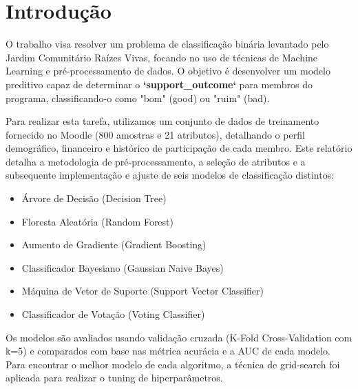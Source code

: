 \section*{Introdução}
O trabalho visa resolver um problema de classificação binária levantado pelo Jardim Comunitário Raízes Vivas, focando no uso de técnicas de Machine Learning e pré-processamento de dados.
O objetivo é desenvolver um modelo preditivo capaz de determinar o \textbf{`support\_outcome`} para membros do programa, classificando-o como "bom" (good) ou "ruim" (bad).

Para realizar esta tarefa, utilizamos um conjunto de dados de treinamento fornecido no Moodle (800 amostras e 21 atributos), detalhando o perfil demográfico, financeiro e histórico de participação de cada membro.
Este relatório detalha a metodologia de pré-processamento, a seleção de atributos e a subsequente implementação e ajuste de seis modelos de classificação distintos:
\begin{itemize}
    \item Árvore de Decisão (Decision Tree)
    \item Floresta Aleatória (Random Forest)
    \item Aumento de Gradiente (Gradient Boosting)
    \item Classificador Bayesiano (Gaussian Naive Bayes)
    \item Máquina de Vetor de Suporte (Support Vector Classifier)
    \item Classificador de Votação (Voting Classifier)
\end{itemize}
Os modelos são avaliados usando validação cruzada (K-Fold Cross-Validation com k=5) e comparados com base nas métrica acurácia e a AUC de cada modelo. Para encontrar o melhor modelo de cada algoritmo, a técnica de grid-search foi aplicada para realizar o tuning de hiperparâmetros.
